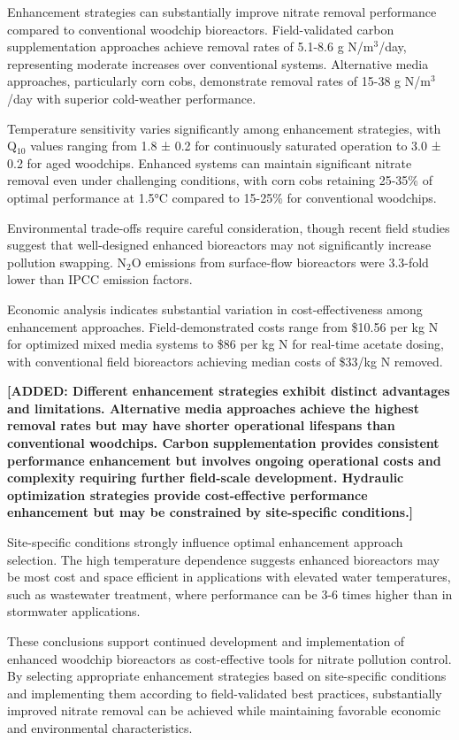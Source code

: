 \documentclass[12pt,a4paper]{article}
\newcommand{\added}[1]{\textcolor{addedtext}{\textbf{[ADDED: #1]}}}
\begin{document}
Enhancement strategies can substantially improve nitrate removal performance compared to conventional woodchip bioreactors. Field-validated carbon supplementation approaches achieve removal rates of 5.1-8.6 g N/m$^3$/day, representing moderate increases over conventional systems. Alternative media approaches, particularly corn cobs, demonstrate removal rates of 15-38 g N/m$^3$/day with superior cold-weather performance.

Temperature sensitivity varies significantly among enhancement strategies, with Q$_{10}$ values ranging from 1.8 ± 0.2 for continuously saturated operation to 3.0 ± 0.2 for aged woodchips. Enhanced systems can maintain significant nitrate removal even under challenging conditions, with corn cobs retaining 25-35\% of optimal performance at 1.5°C compared to 15-25\% for conventional woodchips.

Environmental trade-offs require careful consideration, though recent field studies suggest that well-designed enhanced bioreactors may not significantly increase pollution swapping. N$_2$O emissions from surface-flow bioreactors were 3.3-fold lower than IPCC emission factors.

Economic analysis indicates substantial variation in cost-effectiveness among enhancement approaches. Field-demonstrated costs range from \$10.56 per kg N for optimized mixed media systems to \$86 per kg N for real-time acetate dosing, with conventional field bioreactors achieving median costs of \$33/kg N removed.

\added{Different enhancement strategies exhibit distinct advantages and limitations. Alternative media approaches achieve the highest removal rates but may have shorter operational lifespans than conventional woodchips. Carbon supplementation provides consistent performance enhancement but involves ongoing operational costs and complexity requiring further field-scale development. Hydraulic optimization strategies provide cost-effective performance enhancement but may be constrained by site-specific conditions.}

Site-specific conditions strongly influence optimal enhancement approach selection. The high temperature dependence suggests enhanced bioreactors may be most cost and space efficient in applications with elevated water temperatures, such as wastewater treatment, where performance can be 3-6 times higher than in stormwater applications.

These conclusions support continued development and implementation of enhanced woodchip bioreactors as cost-effective tools for nitrate pollution control. By selecting appropriate enhancement strategies based on site-specific conditions and implementing them according to field-validated best practices, substantially improved nitrate removal can be achieved while maintaining favorable economic and environmental characteristics.
\end{document}
